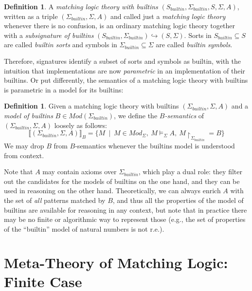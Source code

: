 \documentclass[UTF8,11pt]{article}
\newcounter{thmcounter}
\theoremstyle{plain}
\theoremstyle{definition}
\newtheorem{definition} [thmcounter]{Definition}
\theoremstyle{remark}
\newcommand{\Mod}{\textit{Mod}}
\newcommand{\denote}[1]{\llbracket{#1}\rrbracket}
\newcommand{\reduct}[2]{\mbox{${#1}\!\!\upharpoonright_{#2}$}}
\newcommand{\builtin}{\textit{builtin}}
\begin{document}
\begin{definition}
A \emph{matching logic theory with builtins}
$(S_\builtin,\Sigma_\builtin,S,\Sigma,A)$, written as a triple
$(\Sigma_\builtin,\Sigma,A)$ and
called just a \emph{matching logic theory} whenever there is no confusion,
is an ordinary matching logic theory together with a
\emph{subsignature of builtins}
$(S_\builtin,\Sigma_\builtin)\hookrightarrow(S,\Sigma)$.
Sorts in $S_\builtin \subseteq S$ are called \emph{builtin sorts} and symbols in
$\Sigma_\builtin \subseteq \Sigma$ are called \emph{builtin symbols}.
\end{definition}

Therefore, signatures identify a subset of sorts and symbols as builtin,
with the intuition that implementations are now \emph{parametric} in an
implementation of their builtins.
Or put differently, the semantics of a matching logic theory with builtins
is parametric in a model for its builtins:

\begin{definition}
Given a matching logic theory with builtins $(\Sigma_\builtin,\Sigma,A)$ and
a \emph{model of builtins} $B \in \Mod(\Sigma_\builtin)$, we define
the \emph{$B$-semantics} of $(\Sigma_\builtin,\Sigma,A)$ loosely as follows:
$$
\denote{(\Sigma_\builtin,\Sigma,A)}_B = 
\{M \ \mid \ M \in \Mod_{\Sigma},\ M \models_{\Sigma} A,\ \reduct{M}{\Sigma_\builtin} = B \}
$$
We may drop $B$ from $B$-semantics whenever the builtins model is
understood from context.
\end{definition}

Note that $A$ may contain axioms over $\Sigma_\builtin$, which play a dual
role: they filter out the candidates for the models of builtins on the one
hand, and they can be used in reasoning on the other hand.
Theoretically, we can always enrich $A$ with the set of \emph{all} patterns
matched by $B$, and thus all the properties of the model of builtins are
available for reasoning in any context, but note that in practice there may
be no finite or algorithmic way to represent those
(e.g., the set of properties of the ``builtin'' model of natural numbers is
not r.e.).


\section{Meta-Theory of Matching Logic: Finite Case}

\newcommand{\Kfinite}{{K_\text{finite}}}
\end{document}
